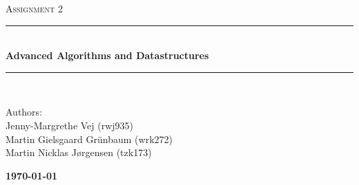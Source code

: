 \documentclass[10pt]{article}
\newcommand{\HRule}{\rule{\linewidth}{0.5mm}}
\begin{document}
\begin{titlepage}

\begin{center}

\textsc{\LARGE Assignment 2}\\%


\HRule \\[0.4cm]

{ \bfseries\large Advanced Algorithms and Datastructures}\\[1cm]

\HRule \\ [7.5cm]

\begin{minipage}{0.5\textwidth}
\begin{flushleft} \large
Authors:\\
Jenny-Margrethe Vej (rwj935)\\
Martin Gielsgaard Grünbaum (wrk272)\\
Martin Nicklas Jørgensen (tzk173)\\
\vspace{0.5cm}
\end{flushleft}
\end{minipage}
\begin{minipage}{0.4\textwidth}
\begin{flushright} {\large
\textbf{\today} }\\
\end{flushright}
\end{minipage}

\vfill



\end{center}

\end{titlepage}
\clearpage






\newpage
\appendix


\end{document}

